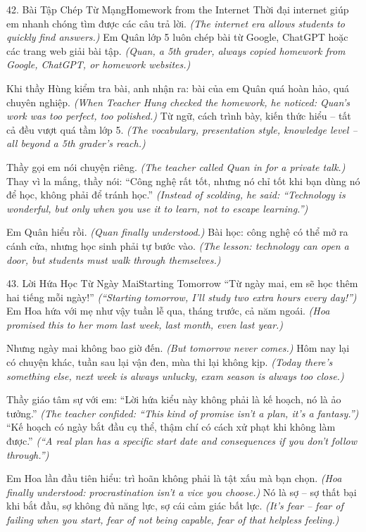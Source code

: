 \begin{truyen}{42. Bài Tập Chép Từ Mạng}{Homework from the Internet}
Thời đại internet giúp em nhanh chóng tìm được các câu trả lời.
\textit{(The internet era allows students to quickly find answers.)}
Em Quân lớp 5 luôn chép bài từ Google, ChatGPT hoặc các trang web giải bài tập.
\textit{(Quan, a 5th grader, always copied homework from Google, ChatGPT, or homework websites.)}

Khi thầy Hùng kiểm tra bài, anh nhận ra: bài của em Quân quá hoàn hảo, quá chuyên nghiệp.
\textit{(When Teacher Hung checked the homework, he noticed: Quan's work was too perfect, too polished.)}
Từ ngữ, cách trình bày, kiến thức hiểu -- tất cả đều vượt quá tầm lớp 5.
\textit{(The vocabulary, presentation style, knowledge level -- all beyond a 5th grader's reach.)}

Thầy gọi em nói chuyện riêng.
\textit{(The teacher called Quan in for a private talk.)}
Thay vì la mắng, thầy nói: ``Công nghệ rất tốt, nhưng nó chỉ tốt khi bạn dùng nó để học, không phải để tránh học.''
\textit{(Instead of scolding, he said: ``Technology is wonderful, but only when you use it to learn, not to escape learning.'')}

Em Quân hiểu rồi.
\textit{(Quan finally understood.)}
Bài học: công nghệ có thể mở ra cánh cửa, nhưng học sinh phải tự bước vào.
\textit{(The lesson: technology can open a door, but students must walk through themselves.)}
\end{truyen}

\begin{truyen}{43. Lời Hứa Học Từ Ngày Mai}{Starting Tomorrow}
``Từ ngày mai, em sẽ học thêm hai tiếng mỗi ngày!''
\textit{(``Starting tomorrow, I'll study two extra hours every day!'')}
Em Hoa hứa với mẹ như vậy tuần lễ qua, tháng trước, cả năm ngoái.
\textit{(Hoa promised this to her mom last week, last month, even last year.)}

Nhưng ngày mai không bao giờ đến.
\textit{(But tomorrow never comes.)}
Hôm nay lại có chuyện khác, tuần sau lại vận đen, mùa thi lại không kịp.
\textit{(Today there's something else, next week is always unlucky, exam season is always too close.)}

Thầy giáo tâm sự với em: ``Lời hứa kiểu này không phải là kế hoạch, nó là ảo tưởng.''
\textit{(The teacher confided: ``This kind of promise isn't a plan, it's a fantasy.'')}
``Kế hoạch có ngày bắt đầu cụ thể, thậm chí có cách xử phạt khi không làm được.''
\textit{(``A real plan has a specific start date and consequences if you don't follow through.'')}

Em Hoa lần đầu tiên hiểu: trì hoãn không phải là tật xấu mà bạn chọn.
\textit{(Hoa finally understood: procrastination isn't a vice you choose.)}
Nó là sợ -- sợ thất bại khi bắt đầu, sợ không đủ năng lực, sợ cái cảm giác bất lực.
\textit{(It's fear -- fear of failing when you start, fear of not being capable, fear of that helpless feeling.)}
\end{truyen}

